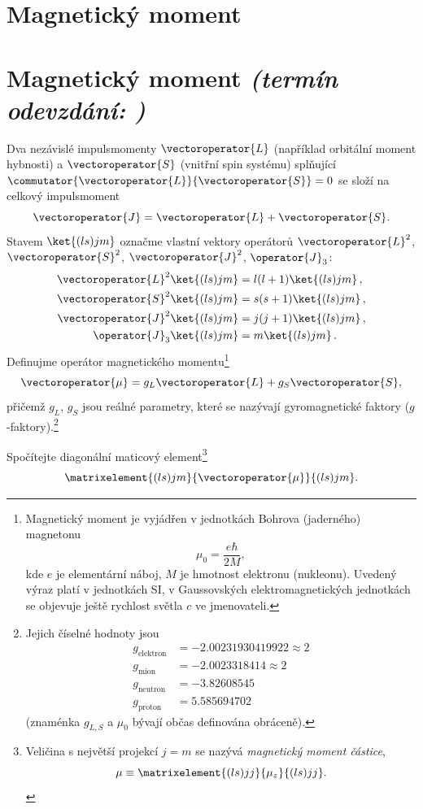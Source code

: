 \documentclass[a4paper,11pt,twoside]{book}
\def\np{\newpage}
\newcommand{\exercise}[2][]{\ifthenelse{\isempty{#1}}
	{\np\section{#2}}
	{\np\section[#2]{{#2} \small{\it{(termín odevzdání: {#1})}}}}
}
\begin{document}
\exercise{Magnetický moment}
	Dva nezávislé impulsmomenty $\vectoroperator{L}$ (například orbitální moment hybnosti) a $\vectoroperator{S}$ (vnitřní spin systému) splňující $\commutator{\vectoroperator{L}}{\vectoroperator{S}}=0$ se složí na celkový impulsmoment
	\begin{equation*}
		\vectoroperator{J}=\vectoroperator{L}+\vectoroperator{S}.
	\end{equation*}
	Stavem $\ket{(ls)jm}$ označme vlastní vektory operátorů $\vectoroperator{L}^{2}$, $\vectoroperator{S}^{2}$, $\vectoroperator{J}^{2}$, $\operator{J}_{3}$:
	\begin{align*}
		\vectoroperator{L}^{2}\ket{(ls)jm}&=l(l+1)\ket{(ls)jm}\,,\\
		\vectoroperator{S}^{2}\ket{(ls)jm}&=s(s+1)\ket{(ls)jm}\,,\\
		\vectoroperator{J}^{2}\ket{(ls)jm}&=j(j+1)\ket{(ls)jm}\,,\\
		\operator{J}_{3}\ket{(ls)jm}&=m\ket{(ls)jm}\,.
		\label{eq:lsev}
	\end{align*}
	Definujme operátor magnetického momentu\footnote{
		Magnetický moment je vyjádřen v jednotkách Bohrova (jaderného) magnetonu
		\begin{equation*}
			\mu_{0}=\frac{e\hbar}{2M},
		\end{equation*}
		kde $e$ je elementární náboj, $M$ je hmotnost elektronu (nukleonu).
		Uvedený výraz platí v jednotkách SI, v Gaussovských elektromagnetických jednotkách se objevuje ještě rychlost světla $c$ ve jmenovateli.
	}
	\begin{equation*}
		\vectoroperator{\mu}=g_{L}\vectoroperator{L}+g_{S}\vectoroperator{S},
	\end{equation*}
	přičemž $g_{L}$, $g_{S}$ jsou reálné parametry, které se nazývají gyromagnetické faktory ($g$-faktory).\footnote{
		Jejich číselné hodnoty jsou
		\begin{align*}
			g_{\mathrm{elektron}}&=-2.00231930419922\approx2 \\
			g_{\mathrm{mion}}&=-2.0023318414\approx2 \\
			g_{\mathrm{neutron}}&=-3.82608545\\
			g_{\mathrm{proton}}&=5.585694702
		\end{align*}
		(znaménka $g_{L,S}$ a $\mu_{0}$ bývají občas definována obráceně).
	}

	Spočítejte diagonální maticový element\footnote{
		Veličina s největší projekcí $j=m$ se nazývá \emph{magnetický moment částice},
		\begin{equation*}
			\mu\equiv\matrixelement{(ls)jj}{\mu_{z}}{(ls)jj}.
		\end{equation*}
	}
	\begin{equation*}
		\matrixelement{(ls)jm}{\vectoroperator{\mu}}{(ls)jm}.
	\end{equation*}
\end{document}
